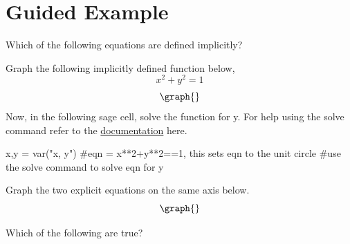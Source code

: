 \documentclass{ximera}
\begin{document}
\section{Guided Example}
\begin{question}
Which of the following equations are defined implicitly?
\begin{selectAll}
\end{selectAll}
\end{question}
Graph the following implicitly defined function below, $$x^2+y^2=1$$
\[
\graph{}
\]
Now, in the following sage cell, solve the function for y. For help using the solve command refer to the \href{http://doc.sagemath.org/html/en/tutorial/tour_algebra.html#solving-equations}{documentation} here.
\begin{onlineOnly}
\begin{sageCell}
x,y = var("x, y")
#eqn = x**2+y**2==1, this sets eqn to the unit circle
#use the solve command to solve eqn for y
\end{sageCell}
\end{onlineOnly}
Graph the two explicit equations on the same axis below.
\[
\graph{}
\]
\begin{question}
Which of the following are true?
\begin{selectAll}
\end{selectAll}
\end{question}
\end{document}
